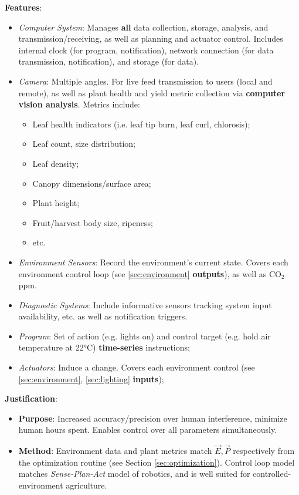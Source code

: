 \documentclass{report}
\begin{document}
\textbf{Features}:
\begin{itemize}
    \item \textit{Computer System}: Manages \textbf{all} data collection, storage, analysis, and transmission/receiving, as well as planning and actuator control. Includes internal clock (for program, notification), network connection (for data transmission, notification), and storage (for data). 
    \item \textit{Camera}: Multiple angles. For live feed transmission to users (local and remote), as well as plant health and yield metric collection via \textbf{computer vision analysis}. Metrics include:
    \begin{itemize}
        \item Leaf health indicators (i.e. leaf tip burn, leaf curl, chlorosis);
        \item Leaf count, size distribution;
        \item Leaf density;
        \item Canopy dimensions/surface area;
        \item Plant height;
        \item Fruit/harvest body size, ripeness;
        \item etc.
    \end{itemize}
    \item \textit{Environment Sensors}: Record the environment's current state. Covers each environment control loop (see \ref{sec:environment} \textbf{outputs}), as well as CO${}_2$ ppm.
\newpage
    \item \textit{Diagnostic Systems}: Include informative sensors tracking system input availability, etc. as well as notification triggers.
    \item \textit{Program}: Set of action (e.g. lights on) and control target (e.g. hold air temperature at 22°C) \textbf{time-series} instructions;
    \item \textit{Actuators}: Induce a change. Covers each environment control (see \ref{sec:environment}, \ref{sec:lighting} \textbf{inputs});
\end{itemize}

\textbf{Justification}: 
\begin{itemize}
    \item \textbf{Purpose}: Increased accuracy/precision over human interference, minimize human hours spent. Enables control over all parameters simultaneously.
    \item \textbf{Method}: Environment data and plant metrics match $\vec E,\vec P$ respectively from the optimization routine (see Section \ref{sec:optimization}). Control loop model matches \textit{Sense-Plan-Act} model of robotics, and is well suited for controlled-environment agriculture.
\end{itemize}
\end{document}
